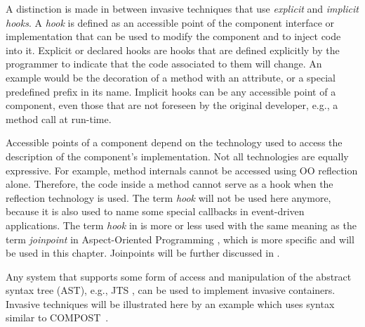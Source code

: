 A distinction is made in \cite{java.compost} between invasive techniques that use \textit{explicit} and \textit{implicit} \textit{hooks}. A \textit{hook} is defined as an accessible point of the component interface or implementation that can be used to modify the component and to inject code into it. Explicit or declared hooks are hooks that are defined explicitly by the programmer to indicate that the code associated to them will change. An example would be the decoration of a method with an attribute, or a special predefined prefix in its name. Implicit hooks can be any accessible point of a component, even those that are not foreseen by the original developer, e.g., a method call at run-time.

Accessible points of a component depend on the technology used to access the description of the component's implementation. Not all technologies are equally expressive. For example, method internals cannot be accessed using OO reflection alone. Therefore, the code inside a method cannot serve as a hook when the reflection technology is used. The term \textit{hook} will not be used here anymore, because it is also used to name some special callbacks in event-driven applications. The term \textit{hook} in \cite{java.compost} is more or less used with the same meaning as the term \textit{joinpoint} in Aspect-Oriented Programming \cite{kiczalesetal.97}, which is more specific and will be used in this chapter. Joinpoints will be further discussed in .

Any system that supports some form of access and manipulation of the abstract syntax tree (AST), e.g., JTS \cite{batory98jts}, can be used to implement invasive containers. Invasive techniques will be illustrated here by an example which uses syntax similar to COMPOST~\cite{java.compost}.

